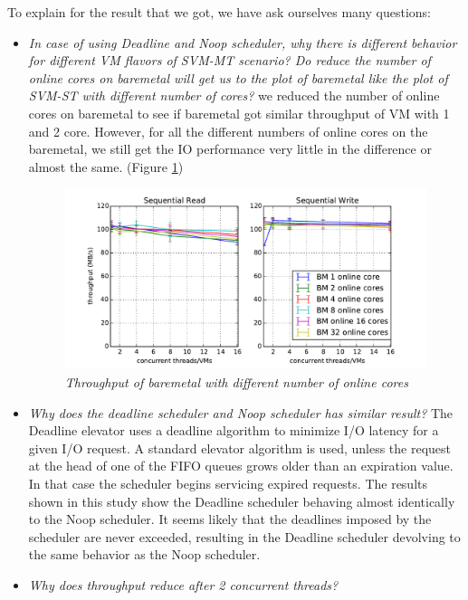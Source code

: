 \documentclass{acmsig}
\begin{document}
To explain for the result that we got, we have ask ourselves many questions:
\begin{itemize}
 \item \textit{In case of using Deadline and Noop scheduler, why there is different behavior for different VM flavors of SVM-MT scenario? Do reduce the number of online cores on baremetal will get us to the plot of baremetal like the plot of SVM-ST with different number of cores?} we reduced the number of online cores on baremetal to see if baremetal got similar throughput of VM with 1 and 2 core. However, for all the different numbers of online cores on the baremetal, we still get the IO performance very little in the difference or almost the same. (Figure \ref{fig:throughputbmdiffonlinecore})
     \begin{figure}[t]
      \centering
      \includegraphics[scale=0.7]{figures/throughput_cfq_bmdiffonlinecore.pdf}
      \caption{\textit{Throughput of baremetal with different number of online cores}}
      \label{fig:throughputbmdiffonlinecore}
     \end{figure}
 \item \textit{Why does the deadline scheduler and Noop scheduler has similar result?} The Deadline elevator uses a deadline algorithm to minimize I/O latency for a given I/O request. A standard elevator algorithm is used, unless the request at the head of one of the FIFO queues grows older than an expiration value. In that case the scheduler begins servicing expired requests. The results shown in this study show the Deadline scheduler behaving almost identically to the Noop scheduler. It seems likely that the deadlines imposed by the scheduler are never exceeded, resulting in the Deadline scheduler devolving to the same behavior as the Noop scheduler.
 \item \textit{Why does throughput reduce after 2 concurrent threads?}

\end{itemize}
\end{document}

